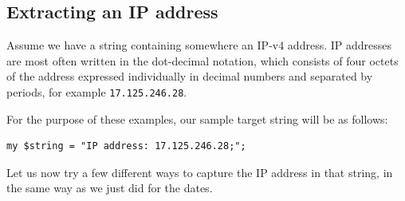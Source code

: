 \subsection{Extracting an IP address}

Assume we have a string containing somewhere an IP-v4 
address. IP addresses are most often written in the 
dot-decimal notation, which consists of four octets of 
the address expressed individually in decimal numbers and 
separated by periods, for example {\tt 17.125.246.28}.

For the purpose of these examples, our sample target string 
will be as follows:

\begin{verbatim}
my $string = "IP address: 17.125.246.28;";
\end{verbatim}
%

Let us now try a few different ways to capture the IP address 
in that string, in the same way as we just did for the dates.

